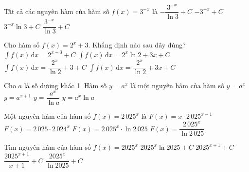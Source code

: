 \begin{ex}%
	Tất cả các nguyên hàm  của hàm số $f(x)=3^{-x}$ là
	 \choice
		{\True $-\dfrac{3^{-x}}{\ln 3}+C$} 
		 {$-{3^{-x}}+C$}
		 {${3^{-x}} \ln 3 +C$}
		{$\dfrac{3^{-x}}{\ln  3}+C$}
\end{ex}

\begin{ex}%
	Cho hàm số $f(x)=2^x+3$. Khẳng định nào sau  đây đúng?
	 \choice
		{$\displaystyle\int f(x)\, \mathrm{d}x=2^{x-3}+C$} 
		{$\displaystyle\int f(x)\, \mathrm{d}x=2^x \ln  2+3x+C$}
		{$\displaystyle\int f(x)\, \mathrm{d}x=\dfrac{2^x}{\ln 2}+3+C$} 
		{\True $\displaystyle\int f(x)\, \mathrm{d}x=\dfrac{2^x}{\ln  2}+3x+C$}
\end{ex}

\begin{ex}%
	Cho $a$  là số dương khác 1. Hàm số $y = a^x$ là một nguyên hàm của hàm số
	 \choice
		{$y  = a^x$}
		 {$y = a^{x+1}$}
		{$y =  \dfrac{a^x}{\ln a}$}
		{\True $y = a^x \ln a$} 
\end{ex}

\begin{ex}%
	Một  nguyên hàm của hàm số $f(x)=2\,025^x$ là
	\choice 
		{$F(x)=x \cdot  2\,025^{x-1}$}
		{$F(x)=2\,025  \cdot 2\,024^x$}
		{$F(x)=2\,025^x \cdot \ln 2\,025$} 
		{\True $F(x)=\dfrac{2\,025^x}{\ln 2\,025}$} 
\end{ex}

\begin{ex}%
	Tìm nguyên hàm của hàm số $f(x)=2025^{x}$ 
	\choice 
		{$2025^{x} \ln 2025+C$} 
		{$2025^{x+1}+C$} 
		{$\dfrac{2025^{x+1}}{x+1}+C$} 
		{\True $\dfrac{2025^{x}}{\ln 2025}+C$} 
\end{ex}

